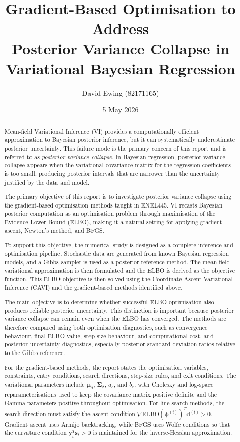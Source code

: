 \documentclass[11pt,a4paper]{article}
\title{
Gradient-Based Optimisation to Address\\
Posterior Variance Collapse in\\
Variational Bayesian Regression
}
\author{
  David Ewing (82171165)\\
}
\date{5 May 2026}
\newcommand{\ELBO}{\text{ELBO}}
\begin{document}
\maketitle

\begin{abstract}
\setlength{\parindent}{0pt}
\setlength{\parskip}{0.7em}


\setlength{\parindent}{0pt}
\setlength{\parskip}{0.7em}

Mean-field Variational Inference (VI) provides a computationally efficient approximation to Bayesian posterior inference, but it can systematically underestimate posterior uncertainty. This failure mode is the primary concern of this report and is referred to as \emph{posterior variance collapse}. In Bayesian regression, posterior variance collapse appears when the variational covariance matrix for the regression coefficients is too small, producing posterior intervals that are narrower than the uncertainty justified by the data and model.

The primary objective of this report is to investigate posterior variance collapse using the gradient-based optimisation methods taught in ENEL445.
 VI recasts Bayesian posterior computation as an optimisation problem through maximisation of the Evidence Lower Bound (ELBO), 
 making it a natural setting for applying gradient ascent, Newton's method, and BFGS. 

To support this objective, the numerical study is designed as a complete inference-and-optimisation pipeline. 
Stochastic data are generated from known Bayesian regression models, and a Gibbs sampler is used as a posterior-reference method. 
The mean-field variational approximation is then formulated and the ELBO is derived as the objective function. 
This ELBO objective is then solved using the 
 Coordinate Ascent Variational Inference (CAVI)   and the  gradient-based methods identified above.

The main objective is to determine whether successful ELBO optimisation also produces reliable posterior uncertainty. This distinction is important because posterior variance collapse can remain even when the ELBO has converged. The methods are therefore compared using both optimisation diagnostics, such as convergence behaviour, final ELBO value, step-size behaviour, and computational cost, and posterior-uncertainty diagnostics, especially posterior standard-deviation ratios relative to the Gibbs reference.

For the gradient-based methods, the report states the optimisation variables, constraints, entry conditions, search directions, step-size rules, and exit conditions. The variational parameters include $\bm{\mu}_\beta$, $\bm{\Sigma}_\beta$, $a_e$, and $b_e$, with Cholesky and log-space reparameterisations used to keep the covariance matrix positive definite and the Gamma parameters positive throughout optimisation. For line-search methods, the search direction must satisfy the ascent condition $\nabla\ELBO(\bm{\phi}^{(t)})^T\bm{d}^{(t)} > 0$. Gradient ascent uses Armijo backtracking, while BFGS uses Wolfe conditions so that the curvature condition $\bm{y}_t^T\bm{s}_t>0$ is maintained for the inverse-Hessian approximation.


\end{abstract}
\end{document}
